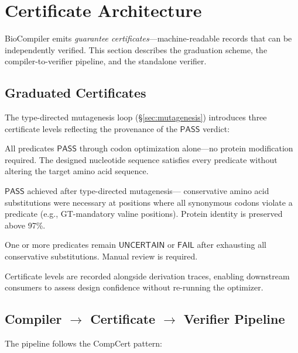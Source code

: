 \documentclass[runningheads]{llncs}
\newcommand{\PASS}{\ensuremath{\mathsf{PASS}}\xspace}
\newcommand{\FAIL}{\ensuremath{\mathsf{FAIL}}\xspace}
\newcommand{\UNCERTAIN}{\ensuremath{\mathsf{UNCERTAIN}}\xspace}
\begin{document}
\section{Certificate Architecture}\label{sec:certificates}

BioCompiler emits \emph{guarantee certificates}---machine-readable
records that can be independently verified.
This section describes the graduation scheme, the
compiler-to-verifier pipeline, and the standalone verifier.

\subsection{Graduated Certificates}

The type-directed mutagenesis loop (\S\ref{sec:mutagenesis})
introduces three certificate levels reflecting the provenance of the
\PASS{} verdict:

\begin{description}[leftmargin=!,labelwidth=1.4cm,itemsep=1pt,
                     topsep=1pt]
\item[GOLD] All predicates \PASS{} through codon optimization
      alone---no protein modification required.
      The designed nucleotide sequence satisfies every predicate without
      altering the target amino acid sequence.

\item[SILVER] \PASS{} achieved after type-directed mutagenesis---
      conservative amino acid substitutions were necessary at positions
      where all synonymous codons violate a predicate (e.g.,
      GT-mandatory valine positions).
      Protein identity is preserved above 97\%.

\item[BRONZE] One or more predicates remain \UNCERTAIN{} or \FAIL{}
      after exhausting all conservative substitutions.
      Manual review is required.
\end{description}

Certificate levels are recorded alongside derivation traces, enabling
downstream consumers to assess design confidence without re-running the
optimizer.

\subsection{Compiler $\to$ Certificate $\to$ Verifier Pipeline}

The pipeline follows the CompCert pattern:
\end{document}
